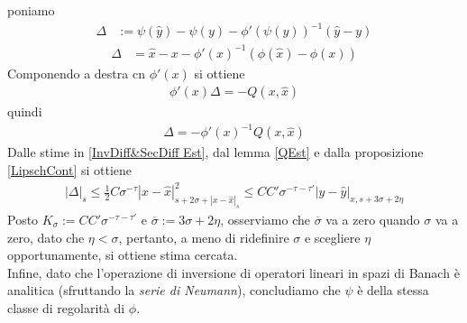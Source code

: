\documentclass[twoside, 11pt]{amsbook}
\makeatletter
\newcommand{\0}{{(0)}}
\newcommand{\3}{{(3)}}
\theoremstyle{colonplain}
\theoremstyle{colondefinition}
\theoremstyle{colonremark}
\numberwithin{equation}{chapter}
\renewcommand{\proofname}{Dimostrazione}
\renewenvironment{proof}[1][\proofname]{\par
  \pushQED{\qed}%
  \normalfont \topsep6\p@\@plus6\p@\relax
  \trivlist
  \item[\hskip\labelsep\bfseries #1:]\ignorespaces
}{%
  \popQED\endtrivlist\@endpefalse
}
\makeatother
\begin{document}
\begin{proof} poniamo
\begin{align}
    \Delta &:= \psi(\hat{y}) - \psi(y) - \phi'(\psi(y))^{-1}(\hat{y} - y)
\end{align}
\begin{align}
    \Delta &= \hat{x} - x - \phi'(x)^{-1}(\phi(\hat{x}) - \phi(x))
\end{align}
Componendo a destra cn $\phi'(x)$ si ottiene
\begin{align}
    \phi'(x)\Delta = -Q(x, \hat{x})
\end{align}
quindi
\begin{align}
    \Delta = -\phi'(x)^{-1}Q(x, \hat{x})
\end{align}
Dalle stime in \eqref{InvDiff&SecDiff Est}, dal lemma \ref{QEst} e dalla proposizione \eqref{LipschCont} si ottiene
\begin{align}
    |\Delta|_s \leq \frac{1}{2}C\sigma^{-\tau}|x - \hat{x}|^2_{s + 2\sigma + |x - \hat{x}|_s} \leq CC'\sigma^{-\tau - \tau'}|y - \hat{y}|_{x, s + 3\sigma + 2\eta}
\end{align}
Posto $K_\sigma := CC'\sigma^{-\tau - \tau'}$ e $\overline{\sigma} := 3\sigma + 2\eta$, osserviamo che $\overline{\sigma}$ va a zero quando $\sigma$ va a zero, dato che $\eta < \sigma$, pertanto, a meno di ridefinire $\sigma$ e scegliere $\eta$ opportunamente, si ottiene stima cercata. \\
Infine, dato che l'operazione di inversione di operatori lineari in spazi di Banach è analitica (sfruttando la \textit{serie di Neumann}), concludiamo che $\psi$ è della stessa classe di regolarità di $\phi$.
\end{proof}

\backmatter
\let\appendixname\empty
\def\chaptername{\bibname}



\end{document}

